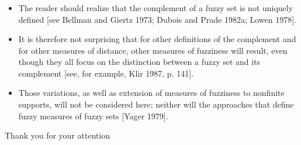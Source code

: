 \documentclass{beamer}
\begin{document}
\begin{CJK*}{UTF8}{bsmi}
\begin{frame}
\end{frame}


\begin{frame}
\frametitle{}

\begin{itemize}
\item The reader should realize that {\color{red}the complement of a fuzzy set is not uniquely defined} [see Bellman and Giertz 1973; Dubois and Prade 1982a; Lowen 1978]. 
\item It is therefore not surprising that for other definitions of the complement and for other measures of distance, other measures of fuzziness will result, even though they all focus on the distinction between a fuzzy set and its complement [see, for example, Klir 1987, p. 141]. 
\item Those variations, as well as {\color{red}extension of measures of fuzziness to nonfinite supports, will not be considered here}; neither will the approaches that define fuzzy measures of fuzzy sets [Yager 1979].

\end{itemize}

\end{frame}

\begin{frame}
\Huge{\centerline{Thank you for your attention}}
\end{frame}


\clearpage\end{CJK*}
\end{document}
